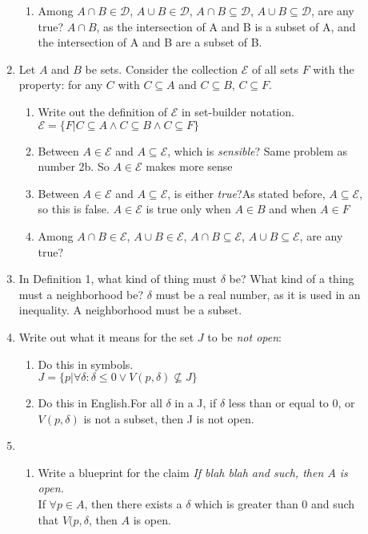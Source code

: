 \documentclass[11pt]{letter}
\theoremstyle{definition}
\begin{document}
\begin{description}
\begin{enumerate}
\begin{enumerate}
				\item Among $A\cap B \in \mathcal{D}$, $A\cup B \in \mathcal{D}$, $A\cap B \subseteq \mathcal{D}$, $A\cup B \subseteq \mathcal{D}$, are any true? $A\cap B$, as the intersection of A and B is a subset of A, and the intersection of A and B are a subset of B.
			\end{enumerate}
		\item Let $A$ and $B$ be sets. Consider the collection $\mathcal{E}$ of all sets $F$ with the property: for any $C$ with $C\subseteq A$ and $C\subseteq B$, $C\subseteq F$.
			\begin{enumerate}
				\item Write out the definition of $\mathcal{E}$ in set-builder notation.
                                  $\mathcal{E}=\{F\vert C\subseteq A \wedge C\subseteq B\wedge C\subseteq F\}$
				\item Between $A\in \mathcal{E}$ and $A\subseteq\mathcal{E}$, which is {\em sensible}? Same problem as number 2b. So $A\in \mathcal{E}$ makes more sense
				\item Between $A\in \mathcal{E}$ and $A\subseteq\mathcal{E}$, is either {\em true}?As stated before, $A\subseteq \mathcal{E}$, so this is false. $A\in \mathcal{E}$ is true only when $A\in B$ and when $A\in F$
				\item Among $A\cap B \in \mathcal{E}$, $A\cup B \in \mathcal{E}$, $A\cap B \subseteq \mathcal{E}$, $A\cup B \subseteq \mathcal{E}$, are any true? 
			\end{enumerate}
		\item In Definition 1, what kind of thing must $\delta$ be? What kind of a thing must a neighborhood be? $\delta$ must be a real number, as it is used in an inequality. A neighborhood must be a subset. 
		\item Write out what it means for the set $J$ to be {\em not open}:
			\begin{enumerate}
				\item Do this in symbols.\\
$J=\{p\vert \forall \delta: \delta \leq 0\vee V(p,\delta)\nsubseteq J\}$
				\item Do this in English.For all $\delta$ in a J, if $\delta$ less than or equal to 0, or $V(p,\delta)$ is not a subset, then J is not open.
			\end{enumerate}
		\item \begin{enumerate}
			\item Write a blueprint for the claim {\em If blah blah and such, then $A$ is open.}\\
If $\forall p\in A$, then there exists a $\delta$ which is greater than 0 and such that $V(p,\delta$, then $A$ is open.


\end{enumerate}
\end{enumerate}
\end{description}
\end{document}
